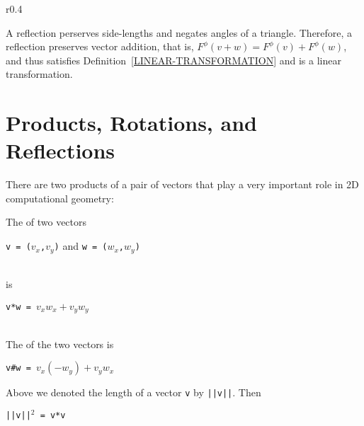 \documentclass[12pt]{article}
\begin{document}
\bigskip

\begin{minipage}{\textwidth}\raggedright
\begin{wrapfigure}[5]{r}{0.4\textwidth}
\end{wrapfigure}
A reflection perserves side-lengths and negates angles of a triangle.
Therefore, a reflection preserves vector addition, that is,
$F^\phi(v+w)=F^\phi(v)+F^\phi(w)$, and thus
satisfies Definition~\ref{LINEAR-TRANSFORMATION}
and is a linear transformation.
\end{minipage}

\newpage

\section{Products, Rotations, and Reflections}
There are two products of a pair of vectors that play a
very important role in 2D computational geometry:

\begin{definition}
The  of two vectors \\
\centerline{{\tt v = ($v_x$,$v_y$)} and {\tt w = ($w_x$,$w_y$)}} \\
is \\
\centerline{\tt v*w = $v_x w_x + v_y w_y$} \\
The  of the two vectors is \\
\centerline{\tt v\#w = $v_x(-w_y) + v_y w_x$}
\end{definition}

Above we denoted the length of a vector {\tt v} by {\tt ||v||}.
Then \\
\centerline{\tt ||v||$^2$ = v*v}
\end{document}

